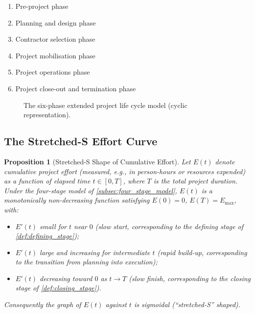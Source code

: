 \documentclass[12pt, a4paper]{report}
\theoremstyle{engnotes}
\newtheorem{prop}{Proposition}[section]
\begin{document}
\begin{enumerate}
    \item Pre-project phase
    \item Planning and design phase
    \item Contractor selection phase
    \item Project mobilisation phase
    \item Project operations phase
    \item Project close-out and termination phase
\end{enumerate}

\begin{figure}[H]
    \centering
    \caption{The six-phase extended project life cycle model (cyclic representation).}
    \label{fig:six_phase_life_cycle}
\end{figure}

\subsection{The Stretched-S Effort Curve}
\label{subsec:stretched_s_curve}

\begin{prop}[Stretched-S Shape of Cumulative Effort]\label{prop:stretched_s}
    Let $E(t)$ denote cumulative project effort (measured, e.g., in person-hours or resources expended) as a function of elapsed time $t \in [0, T]$, where $T$ is the total project duration. Under the four-stage model of \cref{subsec:four_stage_model}, $E(t)$ is a monotonically non-decreasing function satisfying $E(0)=0$, $E(T) = E_{\max}$, with:
    \begin{itemize}
        \item $E'(t)$ small for $t$ near $0$ (slow start, corresponding to the defining stage of \cref{def:defining_stage});
        \item $E'(t)$ large and increasing for intermediate $t$ (rapid build-up, corresponding to the transition from planning into execution);
        \item $E'(t)$ decreasing toward $0$ as $t \to T$ (slow finish, corresponding to the closing stage of \cref{def:closing_stage}).
    \end{itemize}
    Consequently the graph of $E(t)$ against $t$ is sigmoidal (``stretched-S'' shaped).
\end{prop}
\end{document}
